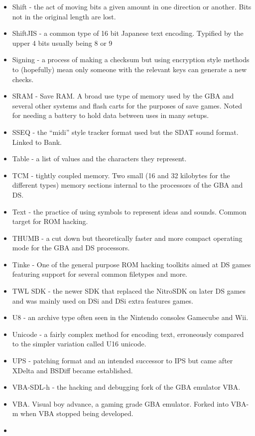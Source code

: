 \documentclass[
]{book}
\begin{document}
\begin{itemize}
\item
  Shift - the act of moving bits a given amount in one direction or another. Bits not in the original length are lost.
\item
  ShiftJIS - a common type of 16 bit Japanese text encoding. Typified by the upper 4 bits usually being 8 or 9
\item
  Signing - a process of making a checksum but using encryption style methods to (hopefully) mean only someone with the relevant keys can generate a new checks.
\item
  SRAM - Save RAM. A broad use type of memory used by the GBA and several other systems and flash carts for the purposes of save games. Noted for needing a battery to hold data between uses in many setups.
\item
  SSEQ - the ``midi'' style tracker format used but the SDAT sound format. Linked to Bank.
\item
  Table - a list of values and the characters they represent.
\item
  TCM - tightly coupled memory. Two small (16 and 32 kilobytes for the different types) memory sections internal to the processors of the GBA and DS.
\item
  Text - the practice of using symbols to represent ideas and sounds. Common target for ROM hacking.
\item
  THUMB - a cut down but theoretically faster and more compact operating mode for the GBA and DS processors.
\item
  Tinke - One of the general purpose ROM hacking toolkits aimed at DS games featuring support for several common filetypes and more.
\item
  TWL SDK - the newer SDK that replaced the NitroSDK on later DS games and was mainly used on DSi and DSi extra features games.
\item
  U8 - an archive type often seen in the Nintendo consoles Gamecube and Wii.
\item
  Unicode - a fairly complex method for encoding text, erroneously compared to the simpler variation called U16 unicode.
\item
  UPS - patching format and an intended successor to IPS but came after XDelta and BSDiff became established.
\item
  VBA-SDL-h - the hacking and debugging fork of the GBA emulator VBA.
\item
  VBA. Visual boy advance, a gaming grade GBA emulator. Forked into VBA-m when VBA stopped being developed.
\item

\end{itemize}
\end{document}

